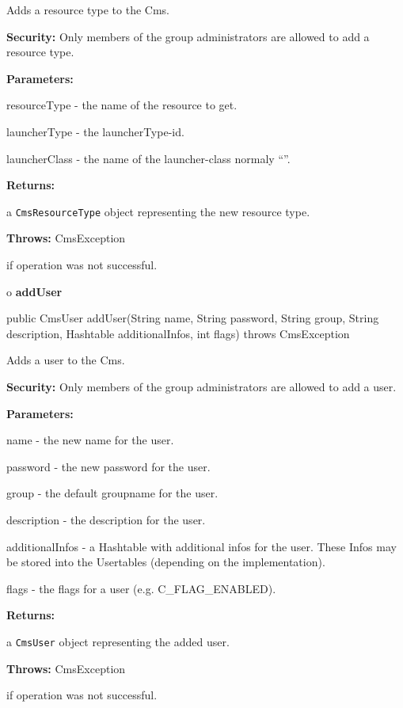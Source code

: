 \begin{description}
\htmlDD Adds a resource type to the Cms. 

{\bf Security:} Only members of the group administrators are allowed to add a
resource type. 

\begin{description}
\item {\bf Parameters:}  

resourceType - the name of the resource to get.  

launcherType - the launcherType-id.  

launcherClass - the name of the launcher-class normaly ``''.  
\item {\bf Returns:}  

a {\tt CmsResourceType} object representing the new resource type.  
\item {\bf Throws:} CmsException  

if operation was not successful.  
\end{description}

\end{description}

o {\bf addUser} 

\begin{PRE}
 public CmsUser addUser(String name,
                        String password,
                        String group,
                        String description,
                        Hashtable additionalInfos,
                        int flags) throws CmsException
\end{PRE}

\begin{description}
\htmlDD Adds a user to the Cms. 

{\bf Security:} Only members of the group administrators are allowed to add a
user. 

\begin{description}
\item {\bf Parameters:}  

name - the new name for the user.  

password - the new password for the user.  

group - the default groupname for the user.  

description - the description for the user.  

additionalInfos - a Hashtable with additional infos for the user. These Infos
may be stored into the Usertables (depending on the implementation).  

flags - the flags for a user (e.g. C\_FLAG\_ENABLED).  
\item {\bf Returns:}  

a {\tt CmsUser} object representing the added user.  
\item {\bf Throws:} CmsException  

if operation was not successful.  
\end{description}

\end{description}

